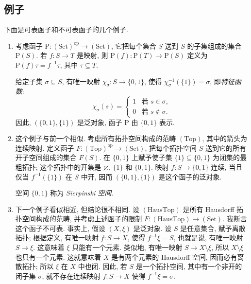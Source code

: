 \subsection{例子}\label{ch02:sec213}
下面是可表函子和不可表函子的几个例子.
\begin{enumerate}
\item[(i)] 考虑函子 $\mathrm P:(\mathrm{Set})^{\mathrm{op}}\to(\mathrm{Set})$, 它把每个集合 $S$ 送到 $S$ 的子集组成的集合 $\mathrm P(S)$. 若 $f:S\to T$ 是映射, 则 $\mathrm P(f):\mathrm P(T)\to\mathrm P(S)$ 定义为 $\mathrm P(f)\tau=f^{-1}\tau$, 其中 $\tau\subseteq T$.

给定子集 $\sigma\subseteq S$, 有唯一映射 $\chi_\sigma:S\to\{0,1\}$, 使得 $\chi_\sigma^{-1}(\{1\})=\sigma$, 即\emph{特征函数}:
\[
\chi_\sigma(s)=\begin{cases}1&\text{若 }s\in\sigma,\\0&\text{若 }s\notin\sigma.\end{cases}
\]
因此, $(\{0,1\},\{1\})$ 是泛对象, 函子 $\mathrm P$ 由 $\{0,1\}$ 表示.

\item[(ii)] 这个例子与前一个相似. 考虑所有拓扑空间构成的范畴 $(\mathrm{Top})$, 其中的箭头为连续映射. 定义函子 $F:(\mathrm{Top})^{\mathrm{op}}\to(\mathrm{Set})$, 把每个拓扑空间 $S$ 送到它的所有开子空间组成的集合 $F(S)$. 在 $\{0,1\}$ 上赋予使子集 $\{1\}\subseteq\{0,1\}$ 为闭集的最粗拓扑; 这个拓扑中的开集是 $\varnothing$, $\{1\}$ 和 $\{0,1\}$.
映射 $f:S\to\{0,1\}$ 连续, 当且仅当 $f^{-1}(\{1\})$ 在 $S$ 中开, 因而 $(\{0,1\},\{1\})$ 是这个函子的泛对象.

空间 $\{0,1\}$ 称为 \emph{Sierpinski 空间}.

\item[(iii)] 下一个例子看似相近, 但结论很不相同. 设 $(\mathrm{HausTop})$ 是所有 Hausdorff 拓扑空间构成的范畴, 并考虑上述函子的限制 $F:(\mathrm{HausTop})\to(\mathrm{Set})$. 我断言这个函子不可表.
事实上, 假设 $(X,\xi)$ 是泛对象. 设 $S$ 是任意集合, 赋予离散拓扑; 根据定义, 有唯一映射 $f:S\to X$, 使得 $f^{-1}\xi=S$, 也就是说, 有唯一映射 $S\to\xi$. 这意味着 $\xi$ 只能有一个元素. 类似地, 有唯一映射
$S\to X\setminus\xi$, 所以 $X\setminus\xi$ 也只有一个元素. 这就意味着 $X$ 是有两个元素的 Hausdorff 空间, 因而必有离散拓扑; 所以 $\xi$ 在 $X$ 中也闭. 因此, 若 $S$ 是一个拓扑空间, 其中有一个非开的闭子集 $\sigma$, 就不存在连续映射 $f:S\to X$ 使得 $f^{-1}\xi=\sigma$.


\end{enumerate}
